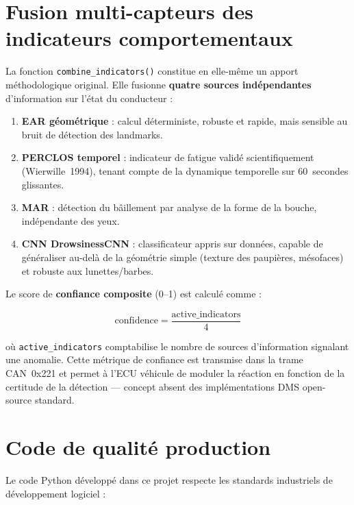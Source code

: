 \documentclass[12pt,a4paper]{report}
\begin{document}
\section{Fusion multi-capteurs des indicateurs comportementaux}

La fonction \texttt{combine\_indicators()} constitue en elle-m\^eme un apport m\'ethodologique original. Elle fusionne \textbf{quatre sources ind\'ependantes} d'information sur l'\'etat du conducteur :

\begin{enumerate}
  \item \textbf{EAR g\'eom\'etrique} : calcul d\'eterministe, robuste et rapide, mais sensible au bruit de d\'etection des landmarks.
  \item \textbf{PERCLOS temporel} : indicateur de fatigue valid\'e scientifiquement (Wierwille~1994), tenant compte de la dynamique temporelle sur 60~secondes glissantes.
  \item \textbf{MAR} : d\'etection du b\^aillement par analyse de la forme de la bouche, ind\'ependante des yeux.
  \item \textbf{CNN DrowsinessCNN} : classificateur appris sur donn\'ees, capable de g\'en\'eraliser au-del\`a de la g\'eom\'etrie simple (texture des paupi\`eres, m\'esofaces) et robuste aux lunettes/barbes.
\end{enumerate}

\noindent Le score de \textbf{confiance composite} (0--1) est calcul\'e comme :

\begin{equation}
\text{confidence} = \frac{\text{active\_indicators}}{4}
\end{equation}

\noindent o\`u \texttt{active\_indicators} comptabilise le nombre de sources d'information signal\-ant une anomalie. Cette m\'etrique de confiance est transmise dans la trame CAN~0x221 et permet \`a l'ECU v\'ehicule de moduler la r\'eaction en fonction de la certitude de la d\'etection --- concept absent des impl\'ementations DMS open-source standard.

\section{Code de qualit\'e production}

Le code Python d\'evelopp\'e dans ce projet respecte les standards industriels de d\'eveloppement logiciel :
\end{document}
